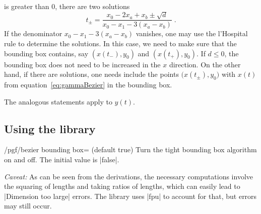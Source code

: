 %
is greater than 0, there are two solutions
%
    \begin{equation}
        t_\pm = \frac{x_{0} - 2x_{a} + x_{b}
            \pm \sqrt{d}}{x_{0} - x_{1} - 3(x_{a}- x_{b})}  \;.
    \end{equation}
%
If the denominator $x_{0} - x_{1} - 3(x_{a} - x_{b})$ vanishes, one may use the
l'Hospital rule to determine the solutions. In this case, we need to make sure
that the bounding box contains, say $(x(t_-),y_0)$ and $(x(t_+),y_0)$. If $d
\le 0$, the bounding box does not need to be increased in the $x$ direction. On
the other hand, if there are solutions, one needs include the points
$\bigl(x(t_\pm),y_0\bigr)$ with $x(t)$ from equation~\eqref{eq:gammaBezier} in
the bounding box.

The analogous statements apply to $y(t)$.


\subsection{Using the library}

\begin{key}{/pgf/bezier bounding box= (default true)}
    Turn the tight bounding box algorithm on and off. The initial value is
    |false|.

    \emph{Caveat:} As can be seen from the derivations, the necessary
    computations involve the squaring of lengths and taking ratios of lengths,
    which can easily lead to |Dimension too large| errors. The library uses
    |fpu| to account for that, but errors may still occur.
\end{key}

\begin{codeexample}[width=5cm,preamble={\usetikzlibrary{bbox}}]
\end{codeexample}

